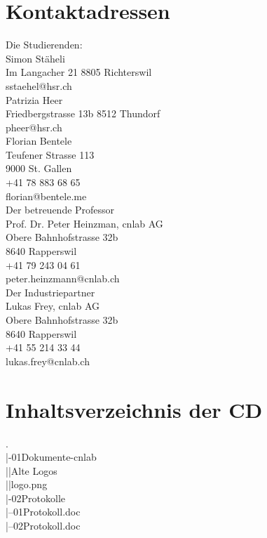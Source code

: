 \section{Kontaktadressen}
Die Studierenden:\\
Simon Stäheli\\
Im Langacher 21
8805 Richterswil\\
sstaehel@hsr.ch\\

Patrizia Heer\\
Friedbergstrasse 13b
8512 Thundorf\\
pheer@hsr.ch\\

Florian Bentele\\
Teufener Strasse 113\\
9000 St. Gallen\\
+41 78 883 68 65\\
florian@bentele.me\\

Der betreuende Professor\\
Prof. Dr. Peter Heinzman, cnlab AG\\
Obere Bahnhofstrasse 32b\\
8640 Rapperswil\\
+41 79 243 04 61\\
peter.heinzmann@cnlab.ch\\

Der Industriepartner\\
Lukas Frey, cnlab AG\\
Obere Bahnhofstrasse 32b\\
8640 Rapperswil\\
+41 55 214 33 44\\
lukas.frey@cnlab.ch

\section{Inhaltsverzeichnis der CD}
.\\
|-01Dokumente-cnlab\\
||Alte Logos\\
||logo.png\\
|-02Protokolle\\
|--01Protokoll.doc\\
|--02Protokoll.doc\\

